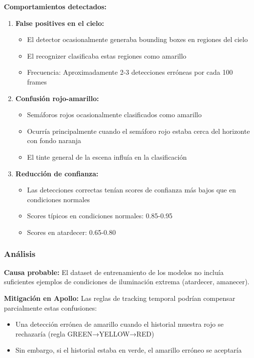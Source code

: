 \textbf{Comportamientos detectados:}

\begin{enumerate}
    \item \textbf{False positives en el cielo:}
    \begin{itemize}
        \item El detector ocasionalmente generaba bounding boxes en regiones del cielo
        \item El recognizer clasificaba estas regiones como amarillo
        \item Frecuencia: Aproximadamente 2-3 detecciones erróneas por cada 100 frames
    \end{itemize}

    \item \textbf{Confusión rojo-amarillo:}
    \begin{itemize}
        \item Semáforos rojos ocasionalmente clasificados como amarillo
        \item Ocurría principalmente cuando el semáforo rojo estaba cerca del horizonte con fondo naranja
        \item El tinte general de la escena influía en la clasificación
    \end{itemize}

    \item \textbf{Reducción de confianza:}
    \begin{itemize}
        \item Las detecciones correctas tenían scores de confianza más bajos que en condiciones normales
        \item Scores típicos en condiciones normales: 0.85-0.95
        \item Scores en atardecer: 0.65-0.80
    \end{itemize}
\end{enumerate}

\subsubsection{Análisis}

\textbf{Causa probable:} El dataset de entrenamiento de los modelos no incluía suficientes ejemplos de condiciones de iluminación extrema (atardecer, amanecer).

\textbf{Mitigación en Apollo:} Las reglas de tracking temporal podrían compensar parcialmente estas confusiones:
\begin{itemize}
    \item Una detección errónea de amarillo cuando el historial muestra rojo se rechazaría (regla GREEN→YELLOW→RED)
    \item Sin embargo, si el historial estaba en verde, el amarillo erróneo se aceptaría
\end{itemize}

